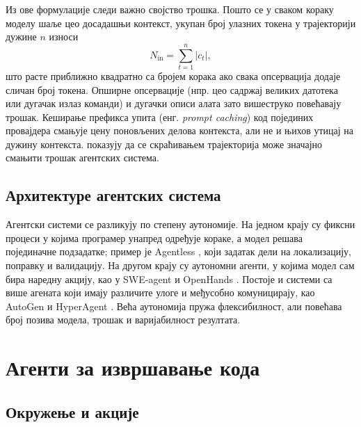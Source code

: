\documentclass[12pt,a4paper]{report}
\begin{document}
	Из ове формулације следи важно својство трошка. Пошто се у сваком кораку
	моделу шаље цео досадашњи контекст, укупан број улазних токена у
	трајекторији дужине $n$ износи
	\begin{equation}
		N_{\text{in}} = \sum_{t=1}^{n} |c_t|,
		\label{eq:ulazni_tokeni}
	\end{equation}
	што расте приближно квадратно са бројем корака ако свака опсервација
	додаје сличан број токена. Опширне опсервације (нпр. цео садржај великих
	датотека или дугачак излаз команди) и дугачки описи алата зато
	вишеструко повећавају трошак. Кеширање префикса упита (енг.
	\textit{prompt caching}) код појединих провајдера смањује цену поновљених
	делова контекста, али не и њихов утицај на дужину контекста.
	\textcite{xiao2025trajectory} показују да се скраћивањем трајекторија може
	значајно смањити трошак агентских система.

	\subsection{Архитектуре агентских система}

	Агентски системи се разликују по степену аутономије. На једном крају су
	фиксни процеси у којима програмер унапред одређује кораке, а модел решава
	појединачне подзадатке; пример је Agentless \parencite{xia2025agentless},
	који задатак дели на локализацију, поправку и валидацију. На другом крају
	су аутономни агенти, у којима модел сам бира наредну акцију, као у
	SWE-agent \parencite{yang2024sweagent} и OpenHands
	\parencite{wang2025openhands}. Постоје и системи са више агената који
	имају различите улоге и међусобно комуницирају, као AutoGen
	\parencite{wu2023autogen} и HyperAgent \parencite{phan2024hyperagent}.
	Већа аутономија пружа флексибилност, али повећава број позива модела,
	трошак и варијабилност резултата.

	\section{Агенти за извршавање кода}

	\subsection{Окружење и акције}
\end{document}
